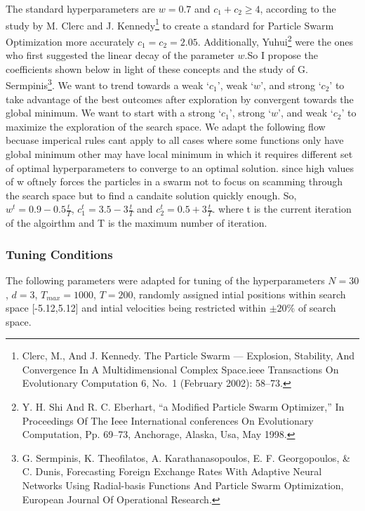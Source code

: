 \documentclass[
]{article}
\begin{document}
The standard hyperparameters are \(w=0.7\) and \(c_1 + c_2 \geq 4\),
according to the study by M. Clerc and J. Kennedy\footnote{Clerc, M.,
  And J. Kennedy. The Particle Swarm --- Explosion, Stability, And
  Convergence In A Multidimensional Complex Space.ieee Transactions On
  Evolutionary Computation 6, No.~1 (February 2002): 58--73.} to create
a standard for Particle Swarm Optimization more accurately
\(c_1 = c_2 = 2.05\). Additionally, Yuhui\footnote{Y. H. Shi And R. C.
  Eberhart, ``a Modified Particle Swarm Optimizer,'' In Proceedings Of
  The Ieee International conferences On Evolutionary Computation, Pp.
  69--73, Anchorage, Alaska, Usa, May 1998.} were the ones who first
suggested the linear decay of the parameter \(w\).So I propose the
coefficients shown below in light of these concepts and the study of G.
Sermpinis\footnote{G. Sermpinis, K. Theofilatos, A. Karathanasopoulos,
  E. F. Georgopoulos, \& C. Dunis, Forecasting Foreign Exchange Rates
  With Adaptive Neural Networks Using Radial-basis Functions And
  Particle Swarm Optimization, European Journal Of Operational Research.}.
We want to trend towards a weak `\(c_1\)', weak `\(w\)', and strong
`\(c_2\)' to take advantage of the best outcomes after exploration by
convergent towards the global minimum. We want to start with a strong
`\(c_1\)', strong `\(w\)', and weak `\(c_2\)' to maximize the
exploration of the search space. We adapt the following flow becuase
imperical rules cant apply to all cases where some functions only have
global minimum other may have local minimum in which it requires
different set of optimal hyperparameters to converge to an optimal
solution. since high values of w oftnely forces the particles in a swarm
not to focus on scamming through the search space but to find a candaite
solution quickly enough. So, \(w^t=0.9-0.5\frac{t}{T}\),
\(c_1^t=3.5-3\frac{t}{T}\) and \(c_2^t=0.5+3\frac{t}{T}\). where t is
the current iteration of the algoirthm and T is the maximum number of
iteration.

\hypertarget{tuning-conditions}{%
\subsubsection{Tuning Conditions}\label{tuning-conditions}}

The following parameters were adapted for tuning of the hyperparameters
\(N=30\), \(d=3\), \(T_{max}=1000\), \(T=200\), randomly assigned intial
positions within search space {[}-5.12,5.12{]} and intial velocities
being restricted within \(\pm20\%\) of search space.
\end{document}
